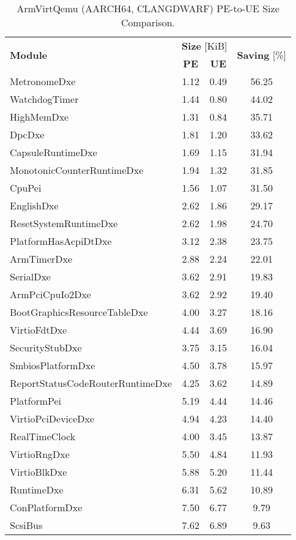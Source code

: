 \begin{longtable}{l c c c}
  \caption{ArmVirtQemu (AARCH64, CLANGDWARF) PE-to-UE Size Comparison.}\\\\
  \toprule
  \multirow{2}{*}[-2pt]{\textbf{Module}} & \multicolumn{2}{c}{\textbf{Size} [KiB]} & \multirow{2}{*}[-2pt]{\textbf{Saving} [\%]}\\
  \cmidrule{2-3}
  & \textbf{PE} & \textbf{UE} &\\
  \midrule
  MetronomeDxe & 1.12 & 0.49 & 56.25\\
  WatchdogTimer & 1.44 & 0.80 & 44.02\\
  HighMemDxe & 1.31 & 0.84 & 35.71\\
  DpcDxe & 1.81 & 1.20 & 33.62\\
  CapsuleRuntimeDxe & 1.69 & 1.15 & 31.94\\
  MonotonicCounterRuntimeDxe & 1.94 & 1.32 & 31.85\\
  CpuPei & 1.56 & 1.07 & 31.50\\
  EnglishDxe & 2.62 & 1.86 & 29.17\\
  ResetSystemRuntimeDxe & 2.62 & 1.98 & 24.70\\
  PlatformHasAcpiDtDxe & 3.12 & 2.38 & 23.75\\
  ArmTimerDxe & 2.88 & 2.24 & 22.01\\
  SerialDxe & 3.62 & 2.91 & 19.83\\
  ArmPciCpuIo2Dxe & 3.62 & 2.92 & 19.40\\
  BootGraphicsResourceTableDxe & 4.00 & 3.27 & 18.16\\
  VirtioFdtDxe & 4.44 & 3.69 & 16.90\\
  SecurityStubDxe & 3.75 & 3.15 & 16.04\\
  SmbiosPlatformDxe & 4.50 & 3.78 & 15.97\\
  ReportStatusCodeRouterRuntimeDxe & 4.25 & 3.62 & 14.89\\
  PlatformPei & 5.19 & 4.44 & 14.46\\
  VirtioPciDeviceDxe & 4.94 & 4.23 & 14.40\\
  RealTimeClock & 4.00 & 3.45 & 13.87\\
  VirtioRngDxe & 5.50 & 4.84 & 11.93\\
  VirtioBlkDxe & 5.88 & 5.20 & 11.44\\
  RuntimeDxe & 6.31 & 5.62 & 10.89\\
  ConPlatformDxe & 7.50 & 6.77 & 9.79\\
  ScsiBus & 7.62 & 6.89 & 9.63\\

\end{longtable}
